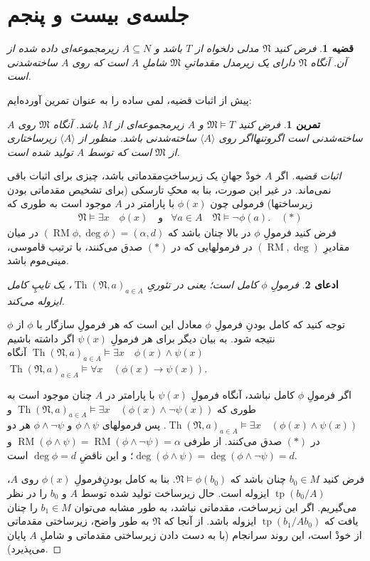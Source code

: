 \documentclass[12pt,a4paper]{report}
\theoremstyle{colorhead}
\newtheorem{thm}{قضیه}
\newtheorem{tam}{تمرین}
\newtheorem{claim}[thm]{ادعای}
\DeclareMathOperator{\Th}{Th}
\DeclareMathOperator{\RM}{RM}
\DeclareMathOperator{\tp}{tp}
\begin{document}
\section{	جلسه‌ی بیست و پنجم}
\begin{thm}
فرض کنید
$\mathfrak{N}$
مدلی دلخواه از
$T$
باشد و 
$A\subseteq N$
زیرمجموعه‌ای داده شده از آن. آنگاه 
$\mathfrak{N}$
دارای یک زیرمدل مقدماتیِ 
$\mathfrak{M}$
شاملِ
$A$
است که روی
$A$
ساخته‌شدنی است. 
\end{thm}
پیش از اثبات قضیه، لمی ساده را به عنوان تمرین آورده‌ایم:
\begin{tam}
فرض کنید
$\mathfrak{M}\models T$
و
$A$
زیرمجموعه‌ای از
$M$
باشد. آنگاه
$\mathfrak{M}$
روی
$A$
ساخته‌شدنی است اگروتنهااگر روی
$\langle A\rangle$
ساخته‌شدنی باشد. منظور از
$\langle A\rangle$
زیرساختاری از
$\mathfrak{M}$
است که توسط 
$A$
تولید شده است. 
\end{tam}
\begin{proof}[اثبات قضیه]
اگر
$A$
خودْ جهانِ یک زیرساختِ‌مقدماتی باشد، چیزی برای اثبات باقی نمی‌ماند. در غیر این صورت، بنا به محکِ تارسکی (برای تشخیص مقدماتی بودن زیرساختها)
فرمولی چون
$\phi(x)$
با پارامتر در
$A$
موجود است به طوری که
\begin{align*}
& \mathfrak{N}\models \exists x\quad \phi(x)\quad  \text{و}
& \forall a\in A \quad \mathfrak{N}\models \neg \phi(a). \quad (*)
\end{align*}
فرض کنید
فرمولِ
$\phi$
در بالا چنان باشد که 	
$(\RM\phi, \deg \phi)=(\alpha
,d)$
در میان 
مقادیرِ
$(\RM,\deg)$
در
فرمولهایی که در
$(*)$
صدق می‌کنند، با ترتیب قاموسی، مینی‌موم باشد. 
\begin{claim}
فرمولِ
$\phi$
کامل است؛ یعنی  در تئوریِ
$\Th(\mathfrak{N},a)_{a\in A}$،
یک تایپِ کامل ایزوله می‌کند. 
\end{claim}
توجه کنید که کامل بودنِ فرمولِ
$\phi$
معادل این است که هر فرمولِ
سازگار با
$\phi$
از  
$\phi$
نتیجه شود. به بیان دیگر  برای هر فرمولِ
$\psi(x)$
اگر داشته باشیم
$\Th(\mathfrak{N},a)_{a\in A}\models \exists x\quad \phi(x)\wedge \psi(x)$
آنگاه
$\Th(\mathfrak{N},a)_{a\in A}\models \forall x\quad (\phi(x)\to \psi(x))$.
\par 
اگر فرمولِ
$\phi$
کامل نباشد، آنگاه فرمولِ
$\psi(x)$
با پارامتر در
$A$
چنان موجود است به طوری که
$\Th(\mathfrak{N},a)_{a\in A}\models \exists x\quad (\phi(x)\wedge \neg \psi(x))$
و
\mbox{$\Th(\mathfrak{N},a)_{a\in A}\models \exists x\quad (\phi(x)\wedge \psi(x))$}.
پس
فرمولهای
$\phi\wedge\psi$
و
$\phi\wedge\neg \psi$
هر دو در 
$(*)$
صدق می‌کنند.
از طرفی
\mbox{$\RM(\phi\wedge \psi)=\RM(\phi\wedge \neg \psi)=\alpha$}
و
$\deg(\phi\wedge \psi)=\deg (\phi\wedge \neg \psi)=d$؛
و
این ناقضِ
$\deg \phi=d$
است. 
\par 
 فرض کنید
$b_0\in M$
چنان باشد که
\mbox{$\mathfrak{N}\models \phi(b_0)$}.
بنا به کامل بودنِ‌فرمولِ
$\phi(x)$
روی
$A$،
$\tp(b_0/A)$
ایزوله است. حال زیرساخت تولید شده توسط
$A$
و
$b_0$
را در نظر می‌گیریم. اگر این زیرساخت، مقدماتی نباشد، به طور مشابه می‌توان 
$b_1\in M$
را چنان یافت که 
$\tp(b_1/Ab_0)$
ایزوله باشد. از آنجا که
$\mathfrak{N}$
به طور واضح، زیرساختی مقدماتی از خودْ است، این روند سرانجام 
(با به دست دادن زیرساختی مقدماتی و شاملِ
$A$
پایان می‌پذیرد).
\end{proof}
\end{document}
